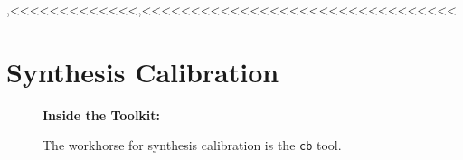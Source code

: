,<<<<<<<<<<<<<,<<<<<<<<<<<<<<<<<<<<<<<<<<<<<<<<%


\chapter{Synthesis Calibration}
\label{chapter:cal}

\begin{wrapfigure}{r}{2.5in}
  \begin{boxedminipage}{2.5in}
     \centerline{\bf Inside the Toolkit:}
     The workhorse for synthesis calibration is the {\tt cb} tool.
  \end{boxedminipage}
\end{wrapfigure}


